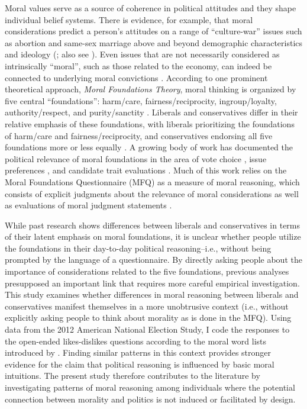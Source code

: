 \documentclass[12pt]{article}
\begin{document}
Moral values serve as a source of coherence in political attitudes and they shape individual belief systems. There is evidence, for example, that moral considerations predict a person's attitudes on a range of ``culture-war'' issues such as abortion and same-sex marriage above and beyond demographic characteristics and ideology (\citealt{koleva2012tracing}; also see \citealt{clifford2015concerns}). Even issues that are not necessarily considered as intrinsically ``moral'', such as those related to the economy, can indeed be connected to underlying moral convictions \citep{ryan2014reconsidering}. According to one prominent theoretical approach, \textit{Moral Foundations Theory}, moral thinking is organized by five central ``foundations'': harm/care, fairness/reciprocity, ingroup/loyalty, authority/respect, and purity/sanctity \citep{haidt2008moral}. Liberals and conservatives differ in their relative emphasis of these foundations, with liberals prioritizing the foundations of harm/care and fairness/reciprocity, and conservatives endorsing all five foundations more or less equally \citep{graham2009liberals}. A growing body of work has documented the political relevance of moral foundations in the area of vote choice \citep{iyer2010beyond, franks2015using}, issue preferences \citep{koleva2012tracing, low2015moral, clifford2015concerns}, and candidate trait evaluations \citep{clifford2014linking}. Much of this work relies on the Moral Foundations Questionnaire (MFQ) as a measure of moral reasoning, which consists of explicit judgments about the relevance of moral considerations as well as evaluations of moral judgment statements \citep[e.g.][]{graham2011mapping}.

While past research shows differences between liberals and conservatives in terms of their latent emphasis on moral foundations, it is unclear whether people utilize the foundations in their day-to-day political reasoning--i.e., without being prompted by the language of a questionnaire. By directly asking people about the importance of considerations related to the five foundations, previous analyses presupposed an important link that requires more careful empirical investigation. This study examines whether differences in moral reasoning between liberals and conservatives manifest themselves in a more unobtrusive context (i.e., without explicitly asking people to think about morality as is done in the MFQ). Using data from the 2012 American National Election Study, I code the responses to the open-ended likes-dislikes questions according to the moral word lists introduced by \citet{graham2009liberals}. Finding similar patterns in this context provides stronger evidence for the claim that political reasoning is influenced by basic moral intuitions. The present study therefore contributes to the literature by investigating patterns of moral reasoning among individuals where the potential connection between morality and politics is not induced or facilitated by design.
\end{document}
